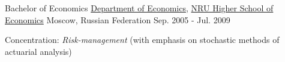 \begin{cventries}
\cventry
    {Bachelor of Economics} %
    {\href{http://economics.hse.ru/en/}{Department of Economics}, \href{http://www.hse.ru/en/}{NRU Higher School of Economics}} %
    {Moscow, Russian Federation} %
    {Sep. 2005 - Jul. 2009} %
    {
      \begin{cvitems} %
        \item {Concentration: \emph{Risk-management} (with emphasis on stochastic methods of actuarial analysis)}
      \end{cvitems}
    }
\end{cventries}
